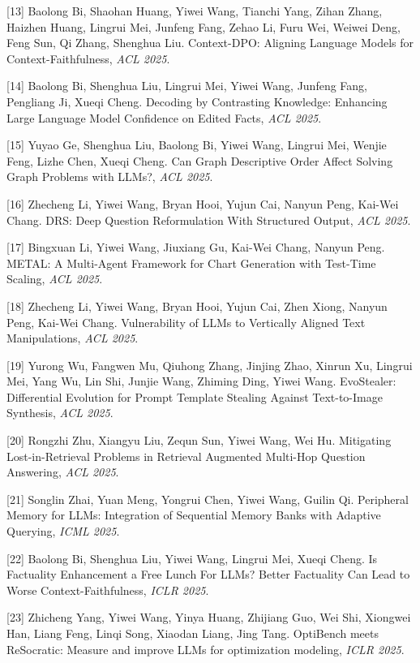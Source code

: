 [13] Baolong Bi, Shaohan Huang, Yiwei Wang, Tianchi Yang, Zihan Zhang, Haizhen Huang, Lingrui Mei, Junfeng Fang, Zehao Li, Furu Wei, Weiwei Deng, Feng Sun, Qi Zhang, Shenghua Liu. Context-DPO: Aligning Language Models for Context-Faithfulness, \textit{ACL 2025}.

[14] Baolong Bi, Shenghua Liu, Lingrui Mei, Yiwei Wang, Junfeng Fang, Pengliang Ji, Xueqi Cheng. Decoding by Contrasting Knowledge: Enhancing Large Language Model Confidence on Edited Facts, \textit{ACL 2025}.

[15] Yuyao Ge, Shenghua Liu, Baolong Bi, Yiwei Wang, Lingrui Mei, Wenjie Feng, Lizhe Chen, Xueqi Cheng. Can Graph Descriptive Order Affect Solving Graph Problems with LLMs?, \textit{ACL 2025}.

[16] Zhecheng Li, Yiwei Wang, Bryan Hooi, Yujun Cai, Nanyun Peng, Kai-Wei Chang. DRS: Deep Question Reformulation With Structured Output, \textit{ACL 2025}.

[17] Bingxuan Li, Yiwei Wang, Jiuxiang Gu, Kai-Wei Chang, Nanyun Peng. METAL: A Multi-Agent Framework for Chart Generation with Test-Time Scaling, \textit{ACL 2025}.

[18] Zhecheng Li, Yiwei Wang, Bryan Hooi, Yujun Cai, Zhen Xiong, Nanyun Peng, Kai-Wei Chang. Vulnerability of LLMs to Vertically Aligned Text Manipulations, \textit{ACL 2025}.

[19] Yurong Wu, Fangwen Mu, Qiuhong Zhang, Jinjing Zhao, Xinrun Xu, Lingrui Mei, Yang Wu, Lin Shi, Junjie Wang, Zhiming Ding, Yiwei Wang. EvoStealer: Differential Evolution for Prompt Template Stealing Against Text-to-Image Synthesis, \textit{ACL 2025}.

[20] Rongzhi Zhu, Xiangyu Liu, Zequn Sun, Yiwei Wang, Wei Hu. Mitigating Lost-in-Retrieval Problems in Retrieval Augmented Multi-Hop Question Answering, \textit{ACL 2025}.

[21] Songlin Zhai, Yuan Meng, Yongrui Chen, Yiwei Wang, Guilin Qi. Peripheral Memory for LLMs: Integration of Sequential Memory Banks with Adaptive Querying, \textit{ICML 2025}.

[22] Baolong Bi, Shenghua Liu, Yiwei Wang, Lingrui Mei, Xueqi Cheng. Is Factuality Enhancement a Free Lunch For LLMs? Better Factuality Can Lead to Worse Context-Faithfulness, \textit{ICLR 2025}.

[23] Zhicheng Yang, Yiwei Wang, Yinya Huang, Zhijiang Guo, Wei Shi, Xiongwei Han, Liang Feng, Linqi Song, Xiaodan Liang, Jing Tang. OptiBench meets ReSocratic: Measure and improve LLMs for optimization modeling, \textit{ICLR 2025}.

